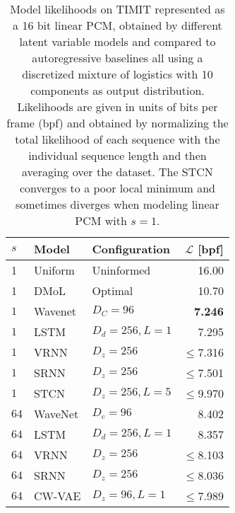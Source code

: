 {\begin{table}[t!]
    \caption{
    Model likelihoods on TIMIT represented as a 16 bit linear PCM, obtained by different latent variable models and compared to autoregressive baselines all using a discretized mixture of logistics with 10 components as output distribution. Likelihoods are given in units of bits per frame (bpf) and obtained by normalizing the total likelihood of each sequence with the individual sequence length and then averaging over the dataset. The STCN converges to a poor local minimum and sometimes diverges when modeling linear PCM with $s=1$.
    }
    \centering
    \begin{tabular}{lll|r}
        \toprule
        $s$    & \bf Model              & \bf Configuration     & \bf $\mathcal{L}$ [bpf] \\
        \midrule
        1         & Uniform             & Uninformed            & 16.00 \\
        1         & DMoL                & Optimal               & 10.70 \\   %
        \midrule
        $1$       & Wavenet             & $D_C=96$              & \textbf{7.246} \\
        $1$       & LSTM                & $D_d=256, L=1$        & 7.295 \\
        $1$       & VRNN                & $D_z=256$             & $\leq$7.316 \\
        $1$       & SRNN                & $D_z=256$             & $\leq$7.501 \\
        $1$       & STCN                & $D_z=256,L=5$         & $\leq$9.970 \\
        \midrule
        $64$      & WaveNet             & $D_c=96$              & 8.402 \\
        $64$      & LSTM                & $D_d=256, L=1$        & 8.357 \\
        $64$      & VRNN                & $D_z=256$             & $\leq$8.103 \\
        $64$      & SRNN                & $D_z=256$             & $\leq$8.036 \\
        $64$      & CW-VAE              & $D_z=96, L=1$         & $\leq$7.989 \\

\end{tabular}
\end{table}}
